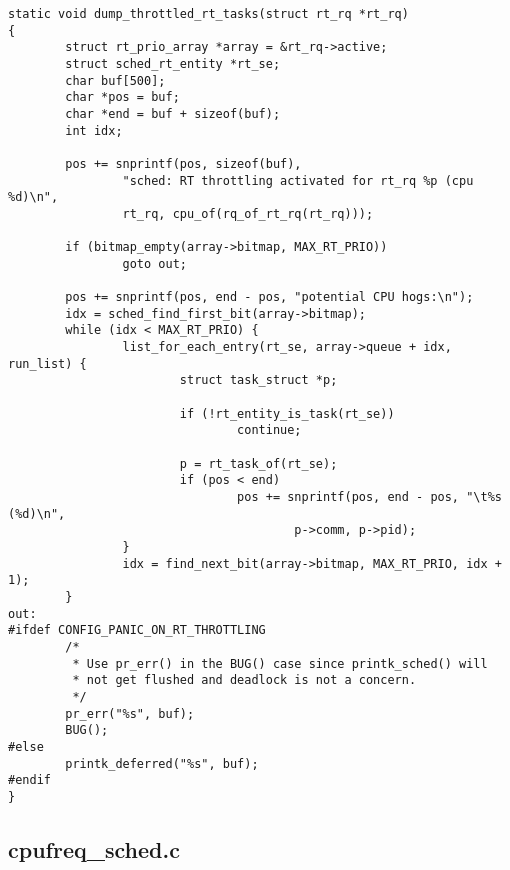 \documentclass{article}
\begin{document}
\begin{verbatim}
static void dump_throttled_rt_tasks(struct rt_rq *rt_rq)
{
        struct rt_prio_array *array = &rt_rq->active;
        struct sched_rt_entity *rt_se;
        char buf[500];
        char *pos = buf;
        char *end = buf + sizeof(buf);
        int idx;

        pos += snprintf(pos, sizeof(buf),
                "sched: RT throttling activated for rt_rq %p (cpu %d)\n",
                rt_rq, cpu_of(rq_of_rt_rq(rt_rq)));

        if (bitmap_empty(array->bitmap, MAX_RT_PRIO))
                goto out;

        pos += snprintf(pos, end - pos, "potential CPU hogs:\n");
        idx = sched_find_first_bit(array->bitmap);
        while (idx < MAX_RT_PRIO) {
                list_for_each_entry(rt_se, array->queue + idx, run_list) {
                        struct task_struct *p;

                        if (!rt_entity_is_task(rt_se))
                                continue;

                        p = rt_task_of(rt_se);
                        if (pos < end)
                                pos += snprintf(pos, end - pos, "\t%s (%d)\n",
                                        p->comm, p->pid);
                }
                idx = find_next_bit(array->bitmap, MAX_RT_PRIO, idx + 1);
        }
out:
#ifdef CONFIG_PANIC_ON_RT_THROTTLING
        /*
         * Use pr_err() in the BUG() case since printk_sched() will
         * not get flushed and deadlock is not a concern.
         */
        pr_err("%s", buf);
        BUG();
#else
        printk_deferred("%s", buf);
#endif
}
\end{verbatim}



\subsection{cpufreq\_sched.c}
\end{document}
